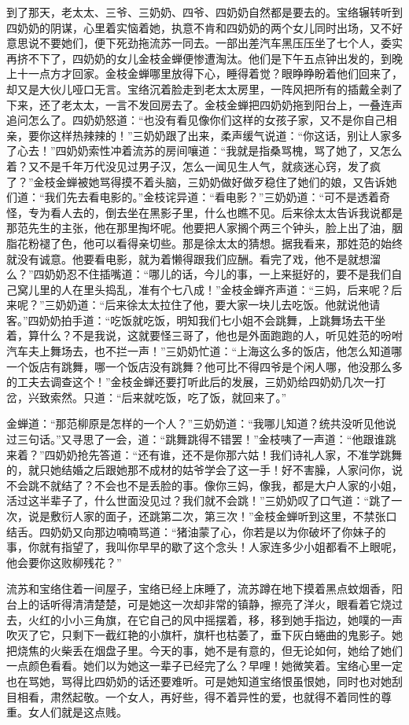 \par 到了那天，老太太、三爷、三奶奶、四爷、四奶奶自然都是要去的。宝络辗转听到四奶奶的阴谋，心里着实恼着她，执意不肯和四奶奶的两个女儿同时出场，又不好意思说不要她们，便下死劲拖流苏一同去。一部出差汽车黑压压坐了七个人，委实再挤不下了，四奶奶的女儿金枝金蝉便惨遭淘汰。他们是下午五点钟出发的，到晚上十一点方才回家。金枝金蝉哪里放得下心，睡得着觉？眼睁睁盼着他们回来了，却又是大伙儿哑口无言。宝络沉着脸走到老太太房里，一阵风把所有的插戴全剥了下来，还了老太太，一言不发回房去了。金枝金蝉把四奶奶拖到阳台上，一叠连声追问怎么了。四奶奶怒道：“也没有看见像你们这样的女孩子家，又不是你自己相亲，要你这样热辣辣的！”三奶奶跟了出来，柔声缓气说道：“你这话，别让人家多了心去！”四奶奶索性冲着流苏的房间嚷道：“我就是指桑骂槐，骂了她了，又怎么着？又不是千年万代没见过男子汉，怎么一闻见生人气，就痰迷心窍，发了疯了？”金枝金蝉被她骂得摸不着头脑，三奶奶做好做歹稳住了她们的娘，又告诉她们道：“我们先去看电影的。”金枝诧异道：“看电影？”三奶奶道：“可不是透着奇怪，专为看人去的，倒去坐在黑影子里，什么也瞧不见。后来徐太太告诉我说都是那范先生的主张，他在那里掏坏呢。他要把人家搁个两三个钟头，脸上出了油，胭脂花粉褪了色，他可以看得亲切些。那是徐太太的猜想。据我看来，那姓范的始终就没有诚意。他要看电影，就为着懒得跟我们应酬。看完了戏，他不是就想溜么？”四奶奶忍不住插嘴道：“哪儿的话，今儿的事，一上来挺好的，要不是我们自己窝儿里的人在里头捣乱，准有个七八成！”金枝金蝉齐声道：“三妈，后来呢？后来呢？”三奶奶道：“后来徐太太拉住了他，要大家一块儿去吃饭。他就说他请客。”四奶奶拍手道：“吃饭就吃饭，明知我们七小姐不会跳舞，上跳舞场去干坐着，算什么？不是我说，这就要怪三哥了，他也是外面跑跑的人，听见姓范的吩咐汽车夫上舞场去，也不拦一声！”三奶奶忙道：“上海这么多的饭店，他怎么知道哪一个饭店有跳舞，哪一个饭店没有跳舞？他可比不得四爷是个闲人哪，他没那么多的工夫去调查这个！”金枝金蝉还要打听此后的发展，三奶奶给四奶奶几次一打岔，兴致索然。只道：“后来就吃饭，吃了饭，就回来了。”
\par 金蝉道：“那范柳原是怎样的一个人？”三奶奶道：“我哪儿知道？统共没听见他说过三句话。”又寻思了一会，道：“跳舞跳得不错罢！”金枝咦了一声道：“他跟谁跳来着？”四奶奶抢先答道：“还有谁，还不是你那六姑！我们诗礼人家，不准学跳舞的，就只她结婚之后跟她那不成材的姑爷学会了这一手！好不害臊，人家问你，说不会跳不就结了？不会也不是丢脸的事。像你三妈，像我，都是大户人家的小姐，活过这半辈子了，什么世面没见过？我们就不会跳！”三奶奶叹了口气道：“跳了一次，说是敷衍人家的面子，还跳第二次，第三次！”金枝金蝉听到这里，不禁张口结舌。四奶奶又向那边喃喃骂道：“猪油蒙了心，你若是以为你破坏了你妹子的事，你就有指望了，我叫你早早的歇了这个念头！人家连多少小姐都看不上眼呢，他会要你这败柳残花？”
\par 流苏和宝络住着一间屋子，宝络已经上床睡了，流苏蹲在地下摸着黑点蚊烟香，阳台上的话听得清清楚楚，可是她这一次却非常的镇静，擦亮了洋火，眼看着它烧过去，火红的小小三角旗，在它自己的风中摇摆着，移，移到她手指边，她噗的一声吹灭了它，只剩下一截红艳的小旗杆，旗杆也枯萎了，垂下灰白蜷曲的鬼影子。她把烧焦的火柴丢在烟盘子里。今天的事，她不是有意的，但无论如何，她给了她们一点颜色看看。她们以为她这一辈子已经完了么？早哩！她微笑着。宝络心里一定也在骂她，骂得比四奶奶的话还要难听。可是她知道宝络恨虽恨她，同时也对她刮目相看，肃然起敬。一个女人，再好些，得不着异性的爱，也就得不着同性的尊重。女人们就是这点贱。
